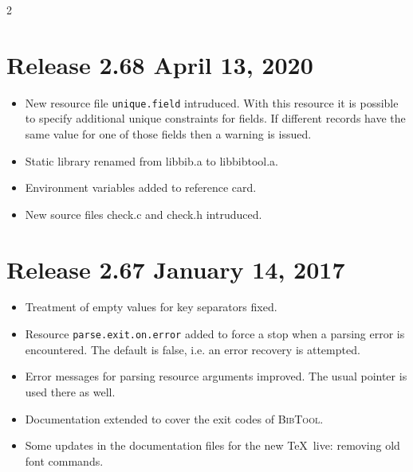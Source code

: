 \documentclass[11pt,a4paper]{scrartcl}
\newcommand\rsc[1]{\texttt{#1}}
\newcommand\File[1]{\textsf{#1}}
\newcommand\BibTool{\textsc{BibTool}}
\newenvironment{Releases}{\begin{multicols}2\RaggedRight}{\end{multicols}}
\newenvironment{Release}[2]{%
  \def\tmp{#2}%
  \section*{Release #1 \ifx\tmp\empty\else{\normalsize[#2]}\fi}
  \begin{itemize}
}{\end{itemize}}
\newenvironment{Fix}[1]{\item }{}
\newenvironment{New}[1]{\item }{}
\newenvironment{Update}[1]{\item }{}
\begin{document}
\begin{Releases}
\begin{Release}{2.68}{April 13, 2020}
\begin{New}{gene}
    New resource file \rsc{unique.field} intruduced. With this
    resource it is possible to specify additional unique constraints
    for fields. If different records have the same value for one of
    those fields then a warning is issued.
  \end{New}
  \begin{Update}{gene}
    Static library renamed from \File{libbib.a} to \File{libbibtool.a}.
  \end{Update}
  \begin{Update}{gene}
    Environment variables added to reference card.
  \end{Update}
  \begin{New}{gene}
    New source files \File{check.c} and \File{check.h} intruduced.
  \end{New}
 \end{Release}

 \begin{Release}{2.67}{January 14, 2017}
  \begin{Fix}{gene}
    Treatment of empty values for key separators fixed.
  \end{Fix}
  \begin{New}{gene}
    Resource \rsc{parse.exit.on.error} added to force a stop when a parsing
    error is encountered. The default is false, i.e. an error recovery is
    attempted.
  \end{New}
  \begin{Update}{gene}
    Error messages for parsing resource arguments improved. The usual pointer
    is used there as well.
  \end{Update}
  \begin{Update}{gene}
    Documentation extended to cover the exit codes of \BibTool.
  \end{Update}
  \begin{Update}{gene}
    Some updates in the documentation files for the new \TeX\ live:
    removing old font commands.
  \end{Update}
 \end{Release}


\end{Releases}
\end{document}
